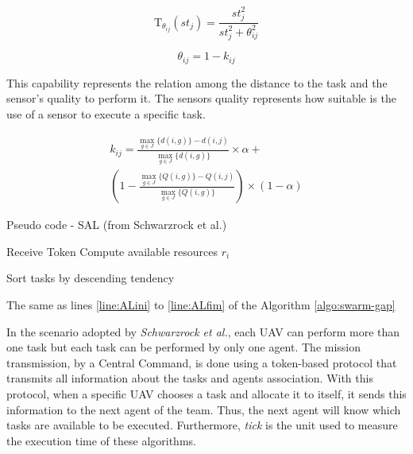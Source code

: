 \begin{equation} \label{eq:tendencia}
	\textrm{T}_{\theta_{ij}}(st_j) = \frac{st_{j}^2}{st_{j}^2 + \theta_{ij}^2}
\end{equation}

\begin{equation} \label{eq:limiar}
	\theta_{ij} = 1 - k_{ij}
\end{equation}

This capability represents the relation among the distance to the task and the sensor's quality to perform it. The sensors quality represents how suitable is the use of a sensor to execute a specific task.

\begin{equation} \label{eq:capability}
\begin{split}
k_{ij} = \frac{\max_{g \in J} \{d(i,g)\} - d(i,j)}{\max_{g \in J} \{d(i,g)\}} \times \alpha + \\
(1 - \frac{\max_{g \in J} \{Q(i,g)\} - Q(i,j)}{\max_{g \in J} \{Q(i,g)\}}) \times (1-\alpha)
\end{split}
\end{equation}

\begin{algorithm}[h!t]
	\caption{Pseudo code - SAL (from Schwarzrock et al.\cite{MAS07})}
	\label{algo:swarm-gap2}
	
	\SetAlgoLined
	\DontPrintSemicolon
	
	\SetNlSkip{0.3em}
	
	Receive Token\;
	Compute available resources $r_i $ \; \label{line:compute_rALA}
	
	Sort tasks by descending tendency\; \label{line:sortbyTend}
	
	
	The same as lines \ref{line:ALini} to \ref{line:ALfim} of the Algorithm \ref{algo:swarm-gap} \;
	
\end{algorithm}

In the scenario adopted by \textit{Schwarzrock et al.}\cite{MAS07}, each UAV can perform more than one task but each task can be performed by only one agent. The mission transmission, by a Central Command, is done using a token-based protocol that transmits all information about the tasks and agents association. With this protocol, when a specific UAV chooses a task and allocate it to itself, it sends this information to the next agent of the team. Thus, the next agent will know which tasks are available to be executed. Furthermore, \textit{tick} is the unit used to measure the execution time of these algorithms.